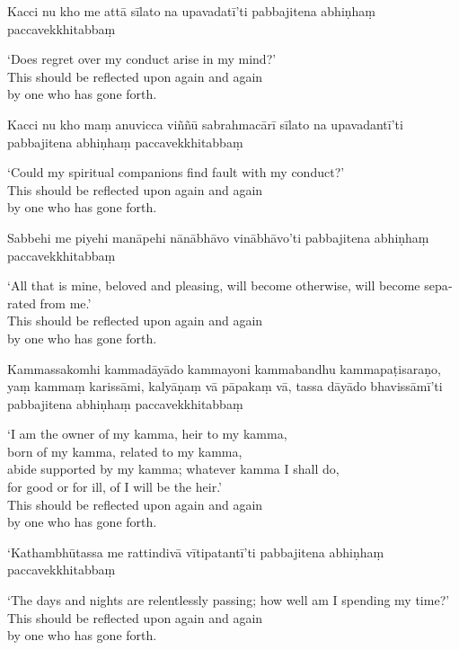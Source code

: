 Kacci nu kho me attā sīlato na upavadatī'ti pabbajitena abhiṇhaṃ paccavekkhitabbaṃ

\begin{english}
  `Does regret over my conduct arise in my mind?'\\
  This should be reflected upon again and again\\
  by one who has gone forth.
\end{english}

Kacci nu kho maṃ anuvicca viññū sabrahmacārī sīlato na upavadantī'ti pabbajitena abhiṇhaṃ paccavekkhitabbaṃ

\begin{english}
  `Could my spiritual companions find fault with my conduct?'\\
  This should be reflected upon again and again\\
  by one who has gone forth.
\end{english}

Sabbehi me piyehi manāpehi nānābhāvo vinābhāvo'ti pabbajitena abhiṇhaṃ paccavekkhitabbaṃ

\begin{english}
  `All that is mine, beloved and pleasing, will become otherwise, will become separated from me.'\\
  This should be reflected upon again and again\\
  by one who has gone forth.
\end{english}

Kammassakomhi kammadāyādo kammayoni kammabandhu kammapaṭisaraṇo, yaṃ kammaṃ karissāmi, kalyāṇaṃ vā pāpakaṃ vā, tassa dāyādo bhavissāmī'ti pabbajitena abhiṇhaṃ paccavekkhitabbaṃ

\begin{english}
  `I am the owner of my kamma, heir to my kamma,\\
  born of my kamma, related to my kamma,\\
  abide supported by my kamma; whatever kamma I shall do,\\
  for good or for ill, of  I will be the heir.'\\
  This should be reflected upon again and again\\
  by one who has gone forth.
\end{english}

`Kathambhūtassa me rattindivā vītipatantī'ti pabbajitena abhiṇhaṃ paccavekkhitabbaṃ

\begin{english}
  `The days and nights are relentlessly passing; how well am I spending my time?'\\
  This should be reflected upon again and again\\
  by one who has gone forth.
\end{english}

